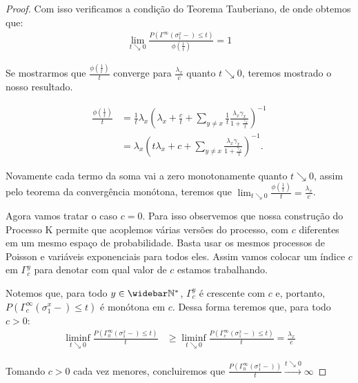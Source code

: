 \begin{proof}
  Com isso verificamos a condição do Teorema Tauberiano, de onde
  obtemos que:
  \begin{align*}
    \lim_{t \searrow 0} \frac{P( \Gamma^\infty(\sigma^x_1-) \leq
      t)}{\phi(\frac{1}{t})} = 1
  \end{align*}

  Se mostrarmos que $\frac{\phi(\frac{1}{t})}{t}$ converge para
  $\frac{\lambda_x}{c}$ quanto $t \searrow 0$, teremos mostrado o
  nosso resultado.

  \begin{align*}
    \frac{\phi(\frac{1}{t})}{t} &= \frac{1}{t} \lambda_x \left(
      \lambda_x + \frac{c}{t} + \sum_{y \neq x} \frac{1}{t}
      \frac{\lambda_x \gamma_x}{1 + \frac{\gamma_x}{t}} \right)^{-1} \\
    &= \lambda_x \left( t\lambda_x + c + \sum_{y \neq x}
      \frac{\lambda_x \gamma_x}{1 + \frac{\gamma_x}{t}} \right)^{-1}.
  \end{align*}

  Novamente cada termo da soma vai a zero monotonamente quanto $t
  \searrow 0$, assim pelo teorema da convergência monótona, teremos que
  $\lim_{t \searrow 0} \frac{\phi(\frac{1}{t})}{t} =
  \frac{\lambda_x}{c}$.

  Agora vamos tratar o caso $c = 0$. Para isso observemos que nossa
  construção do Processo K permite que acoplemos várias versões do
  processo, com $c$ diferentes em um mesmo espaço de
  probabilidade. Basta usar os mesmos processos de Poisson e variáveis
  exponenciais para todos eles. Assim vamos colocar um índice $c$ em
  $\Gamma^y_c$ para denotar com qual valor de $c$ estamos trabalhando.

  Notemos que, para todo $y \in \Nzb$, $\Gamma^y_c$ é crescente com
  $c$ e, portanto, $P ( \Gamma^\infty_c(\sigma^x_1-) \leq t)$ é
  monótona em $c$.  Dessa forma teremos que, para todo $c > 0$:
  \begin{align*}
    \liminf_{t \searrow 0} \frac{P ( \Gamma^\infty_0(\sigma^x_1-) \leq
      t)}{t} &\geq \liminf_{t \searrow 0} \frac{P (
      \Gamma^\infty_c(\sigma^x_1-) \leq t)}{t}
    = \frac{\lambda_x}{c}
  \end{align*}

  Tomando $c > 0$ cada vez menores, concluiremos que $\frac{P (
    \Gamma^\infty_0(\sigma^x_1-))}{t} \xrightarrow{t \searrow 0}
  \infty$
\end{proof}

